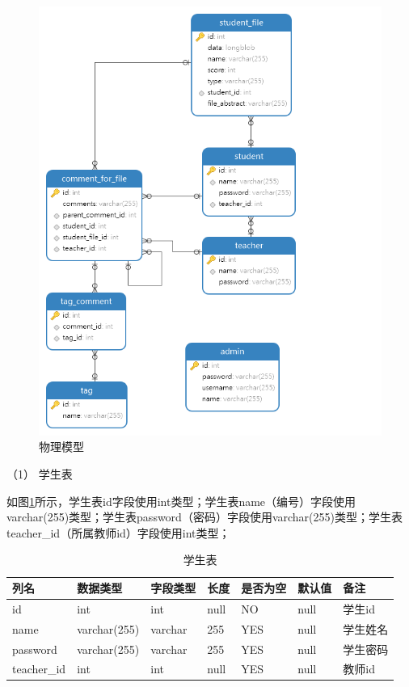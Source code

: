 \begin{figure}[htbp]
    \centering
    \includegraphics[scale = 0.6]{out/uml/数据库/physical-model.png}
    \caption{\song\wuhao 物理模型}
    \label{physical-model}
\end{figure}

（1）  学生表

如图\ref{db-student}所示，学生表id字段使用int类型；学生表name（编号）字段使用varchar(255)类型；学生表password（密码）字段使用varchar(255)类型；学生表teacher\_id（所属教师id）字段使用int类型；
\begin{table}[]
    \centering
    \song\wuhao
    \caption{学生表}
    \label{db-student}
    \begin{tabular}{lllllll}
        \hline
        列名        & 数据类型     & 字段类型 & 长度 & 是否为空 & 默认值 & 备注     \\ \hline
        id          & int          & int      & null & NO       & null   & 学生id   \\
        name        & varchar(255) & varchar  & 255  & YES      & null   & 学生姓名 \\
        password    & varchar(255) & varchar  & 255  & YES      & null   & 学生密码 \\
        teacher\_id & int          & int      & null & YES      & null   & 教师id   \\ \hline
    \end{tabular}
\end{table}

